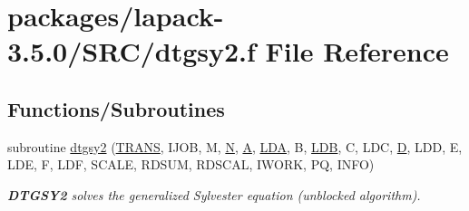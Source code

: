 \hypertarget{dtgsy2_8f}{}\section{packages/lapack-\/3.5.0/\+S\+R\+C/dtgsy2.f File Reference}
\label{dtgsy2_8f}
\subsection*{Functions/\+Subroutines}
\begin{DoxyCompactItemize}
\item 
subroutine \hyperlink{group__doubleSYauxiliary_gaa6de4c854b216a9afb2f6d00eaaa3b45}{dtgsy2} (\hyperlink{superlu__enum__consts_8h_a0c4e17b2d5cea33f9991ccc6a6678d62a1f61e3015bfe0f0c2c3fda4c5a0cdf58}{T\+R\+A\+N\+S}, I\+J\+O\+B, M, \hyperlink{polmisc_8c_a0240ac851181b84ac374872dc5434ee4}{N}, \hyperlink{classA}{A}, \hyperlink{example__user_8c_ae946da542ce0db94dced19b2ecefd1aa}{L\+D\+A}, B, \hyperlink{example__user_8c_a50e90a7104df172b5a89a06c47fcca04}{L\+D\+B}, C, L\+D\+C, \hyperlink{odrpack_8h_a7dae6ea403d00f3687f24a874e67d139}{D}, L\+D\+D, E, L\+D\+E, F, L\+D\+F, S\+C\+A\+L\+E, R\+D\+S\+U\+M, R\+D\+S\+C\+A\+L, I\+W\+O\+R\+K, P\+Q, I\+N\+F\+O)
\begin{DoxyCompactList}\small\item\em {\bfseries D\+T\+G\+S\+Y2} solves the generalized Sylvester equation (unblocked algorithm). \end{DoxyCompactList}\end{DoxyCompactItemize}
